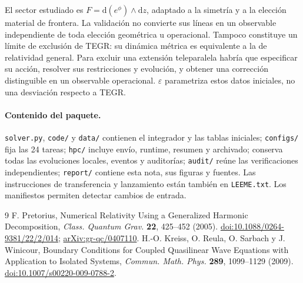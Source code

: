 \documentclass[11pt,a4paper]{article}
\newcommand{\eps}{\varepsilon}
\newcommand{\dd}{\mathrm d}
\begin{document}
El sector estudiado es $F=\dd(e^\phi)\wedge\dd z$, adaptado a la simetría y a la elección material de frontera. La validación no convierte sus líneas en un observable independiente de toda elección geométrica u operacional. Tampoco constituye un límite de exclusión de TEGR: su dinámica métrica es equivalente a la de relatividad general. Para excluir una extensión teleparalela habría que especificar su acción, resolver sus restricciones y evolución, y obtener una corrección distinguible en un observable operacional. $\eps$ parametriza estos datos iniciales, no una desviación respecto a TEGR.

\paragraph{Contenido del paquete.}
\texttt{solver.py}, \texttt{code/} y \texttt{data/} contienen el integrador y las tablas iniciales; \texttt{configs/} fija las 24 tareas; \texttt{hpc/} incluye envío, runtime, resumen y archivado;  conserva todas las evoluciones locales, eventos y auditorías; \texttt{audit/} reúne las verificaciones independientes; \texttt{report/} contiene esta nota, sus figuras y fuentes. Las instrucciones de transferencia y lanzamiento están también en \texttt{LEEME.txt}. Los manifiestos permiten detectar cambios de entrada.

\begin{thebibliography}{9}
 F. Pretorius, Numerical Relativity Using a Generalized Harmonic Decomposition, \emph{Class. Quantum Grav.} \textbf{22}, 425--452 (2005). \href{https://doi.org/10.1088/0264-9381/22/2/014}{doi:10.1088/0264-9381/22/2/014}; \href{https://arxiv.org/abs/gr-qc/0407110}{arXiv:gr-qc/0407110}.
 H.-O. Kreiss, O. Reula, O. Sarbach y J. Winicour, Boundary Conditions for Coupled Quasilinear Wave Equations with Application to Isolated Systems, \emph{Commun. Math. Phys.} \textbf{289}, 1099--1129 (2009). \href{https://doi.org/10.1007/s00220-009-0788-2}{doi:10.1007/s00220-009-0788-2}.
\end{thebibliography}
\end{document}
